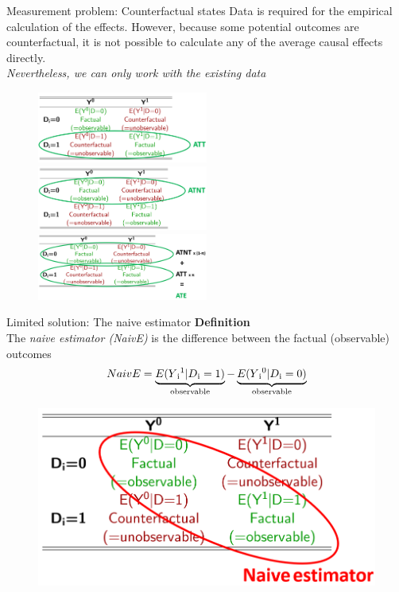\documentclass{beamer}\usepackage[]{graphicx}\usepackage[]{color}
\begin{document}
\begin{frame}{Measurement problem: Counterfactual states}
Data is required for the empirical calculation of the effects. However, because some potential outcomes are counterfactual, it is not possible to calculate any of the average causal effects directly. \\
\textit{Nevertheless, we can only work with the existing data}

\begin{figure}
\centering
\includegraphics[width=0.5\textwidth]{Graphics/ATT.png}
\includegraphics[width=0.5\textwidth]{Graphics/ATNT.png}
\includegraphics[width=0.5\textwidth]{Graphics/ATE.png}
\end{figure}
\end{frame}


\begin{frame}{Limited solution: The naive estimator}
\textbf{Definition}\\
The \textit{naive estimator (NaivE)} is the difference between the factual (observable) outcomes
\begin{align*}
NaivE = \underbrace{E(Y\textsubscript{i}\textsuperscript{1} \vert D\textsubscript{i}=1)}_\text{observable} - \underbrace{E(Y\textsubscript{i}\textsuperscript{0} \vert D\textsubscript{i}=0)}_\text{observable}
\end{align*}
\begin{figure}
\centering
\includegraphics[width=1\textwidth]{Graphics/Naive.png}
\end{figure}
\end{frame}
\end{document}
